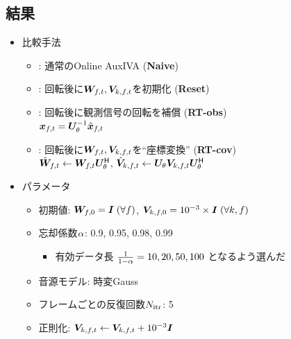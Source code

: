 \documentclass[sip,biber]{now-journal}
\begin{document}
\subsection{結果}
\begin{itemize}
  \item 比較手法
    \begin{itemize}
      \item {}: 通常のOnline AuxIVA (\textbf{Naive})
      \item {}: 回転後に$\Demix _{\ft}, \cov _{\src,\ft}$を初期化 (\textbf{Reset})
      \item {}: 回転後に観測信号の回転を補償 (\textbf{RT-obs})\\
        $\Obs _{\ft} = \rotMat _{\rotSpat} ^{-1} \rot{\Obs} _{\ft}$
      \item {}: 回転後に$\Demix _{\ft}, \cov _{\src,\ft}$を``座標変換'' (\textbf{RT-cov})\\
        $\rot{\Demix} _{\ft} \gets \Demix _{\ft} \rotMat _{\rotSpat} ^{\hermite}$,\; $\rot{\cov} _{\src,\ft} \gets \rotMat _{\rotSpat} \cov _{\src,\ft} \rotMat _{\rotSpat} ^{\hermite}$
    \end{itemize}
  \item パラメータ
    \begin{itemize}
      \item 初期値: $\bm{W} _{f,0} = \bm{I}\; (\forall f)$, $\bm{V} _{k,f,0} = 10^{-3}\times\bm{I}\; (\forall k, f)$
      \item 忘却係数$\alpha$: 0.9, 0.95, 0.98, 0.99
        \begin{itemize}
          \item 有効データ長 $\frac{1}{1 - \alpha} = 10, 20, 50, 100$ となるよう選んだ
        \end{itemize}
      \item 音源モデル: 時変Gauss
      \item フレームごとの反復回数$N _{\mathrm{itr}}$: 5
      \item 正則化: $\cov _{\src,\ft} \gets \cov _{\src,\ft} + 10 ^{-3} \Eye$
    \end{itemize}
\end{itemize}
\end{document}
